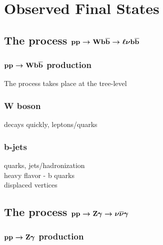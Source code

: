 

\chapter{Observed Final States}

\section[The process \ppwbblnbb]
{The process $\boldsymbol{\mathbf{pp\rightarrow Wb\overline{b}\rightarrow\ell\nu b\overline{b}}}$} \label{sec:wbbproduction}

 \subsection[\ppwbb production]
 {$\boldsymbol{\mathbf{pp\rightarrow Wb\overline{b}}}$ production}
  The process \ppwbb takes place at the 
   tree-level 

 \subsection{W boson}
  decays quickly, leptons/quarks

 \subsection{b-jets}
  quarks, jets/hadronization \\
  heavy flavor - b quarks \\
  displaced vertices

\section[The process \ppzgnng]
        {The process $\boldsymbol{\mathbf{pp\rightarrow \mathrm{Z}\gamma\rightarrow\nu\overline{\nu}\gamma}}$} \label{sec:znngproduction}

 \subsection[\ppzg production]
 {$\boldsymbol{\mathbf{pp\rightarrow \mathrm{Z}\gamma}}$ production}




